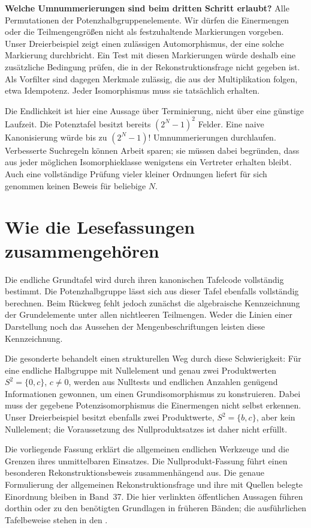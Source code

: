 \medskip\noindent\textbf{Welche Umnummerierungen sind beim dritten Schritt erlaubt?}
Alle Permutationen der Potenzhalbgruppenelemente. Wir dürfen die
Einermengen oder die Teilmengengrößen nicht als festzuhaltende
Markierungen vorgeben. Unser Dreierbeispiel zeigt einen zulässigen
Automorphismus, der eine solche Markierung durchbricht.
Ein Test mit diesen Markierungen würde deshalb eine zusätzliche
Bedingung prüfen, die in der Rekonstruktionsfrage nicht gegeben ist.
Als Vorfilter sind dagegen Merkmale zulässig, die aus der
Multiplikation folgen, etwa Idempotenz. Jeder Isomorphismus muss
sie tatsächlich erhalten.

Die Endlichkeit ist hier eine Aussage über Terminierung, nicht
über eine günstige Laufzeit. Die Potenztafel besitzt bereits
\((2^N-1)^2\) Felder. Eine naive Kanonisierung würde bis zu
\((2^N-1)!\) Umnummerierungen durchlaufen. Verbesserte Suchregeln
können Arbeit sparen; sie müssen dabei begründen, dass aus jeder
möglichen Isomorphieklasse wenigstens ein Vertreter erhalten bleibt.
Auch eine vollständige Prüfung vieler kleiner Ordnungen liefert
für sich genommen keinen Beweis für beliebige \(N\).

\section*{Wie die Lesefassungen zusammengehören}

Die endliche Grundtafel wird durch ihren kanonischen Tafelcode
vollständig bestimmt. Die Potenzhalbgruppe lässt sich aus dieser
Tafel ebenfalls vollständig berechnen. Beim Rückweg fehlt jedoch
zunächst die algebraische Kennzeichnung der Grundelemente unter
allen nichtleeren Teilmengen. Weder die Linien einer Darstellung
noch das Aussehen der Mengenbeschriftungen leisten diese Kennzeichnung.

Die gesonderte \FiniteSemigroupsNullproductsReadingLink{} behandelt
einen strukturellen Weg durch diese Schwierigkeit: Für eine endliche
Halbgruppe mit Nullelement und genau zwei Produktwerten
\(S^2=\{0,c\}\), \(c\ne0\), werden aus Nulltests und endlichen
Anzahlen genügend Informationen gewonnen, um einen Grundisomorphismus
zu konstruieren. Dabei muss der gegebene Potenzisomorphismus die
Einermengen nicht selbst erkennen. Unser Dreierbeispiel besitzt
ebenfalls zwei Produktwerte, \(S^2=\{b,c\}\), aber kein Nullelement;
die Voraussetzung des Nullproduktsatzes ist daher nicht erfüllt.

Die vorliegende Fassung erklärt die allgemeinen endlichen Werkzeuge
und die Grenzen ihres unmittelbaren Einsatzes. Die Nullprodukt-Fassung
führt einen besonderen Rekonstruktionsbeweis zusammenhängend aus.
Die genaue Formulierung der allgemeinen Rekonstruktionsfrage und
ihre mit Quellen belegte Einordnung bleiben in Band~37. Die hier
verlinkten öffentlichen Aussagen führen dorthin oder zu den benötigten
Grundlagen in früheren Bänden; die ausführlichen Tafelbeweise stehen
in den \TableIsomorphismsProofsLink{}.

\noindent\FiniteSemigroupsMainLink{}
\enspace\textperiodcentered\enspace
\FiniteSemigroupsNullproductsReadingLink{}
